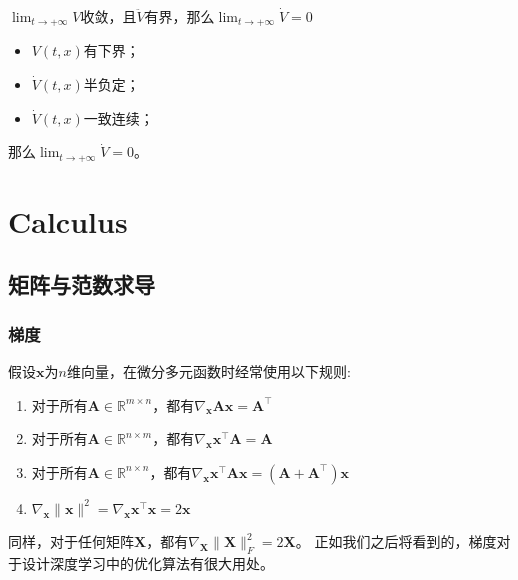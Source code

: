 \documentclass[lang=cn,10pt]{elegantbook}
\begin{document}
\begin{theorem}[Theorem 3]
	$\lim_{t\to +\infty} V$收敛，且$\ddot{V}$有界，那么$\lim_{t \to +\infty}\dot{V} = 0$
\end{theorem}

\begin{theorem}
	\begin{itemize}
		\item $V(t,x)$有下界；
		\item $\dot{V}(t,x)$半负定；
		\item $\dot{V}(t,x)$一致连续；
	\end{itemize}
	那么$\lim_{t\to+\infty}\dot{V}=0$。
\end{theorem}



\chapter{Calculus}
\section{矩阵与范数求导}

\subsection{梯度}

\begin{theorem}
	假设$\mathbf{x}$为$n$维向量，在微分多元函数时经常使用以下规则:
	\begin{enumerate}[1、]
		\item     对于所有$\mathbf{A} \in \mathbb{R}^{m \times n}$，都有$\nabla_{\mathbf{x}} \mathbf{A} \mathbf{x} = \mathbf{A}^\top$
		\item 对于所有$\mathbf{A} \in \mathbb{R}^{n \times m}$，都有$\nabla_{\mathbf{x}} \mathbf{x}^\top \mathbf{A}  = \mathbf{A}$
		\item 对于所有$\mathbf{A} \in \mathbb{R}^{n \times n}$，都有$\nabla_{\mathbf{x}} \mathbf{x}^\top \mathbf{A} \mathbf{x}  = (\mathbf{A} + \mathbf{A}^\top)\mathbf{x}$
		\item $\nabla_{\mathbf{x}} \|\mathbf{x} \|^2 = \nabla_{\mathbf{x}} \mathbf{x}^\top \mathbf{x} = 2\mathbf{x}$
	\end{enumerate}
\end{theorem}

同样，对于任何矩阵$\mathbf{X}$，都有$\nabla_{\mathbf{X}} \|\mathbf{X} \|_F^2 = 2\mathbf{X}$。
正如我们之后将看到的，梯度对于设计深度学习中的优化算法有很大用处。
\end{document}
